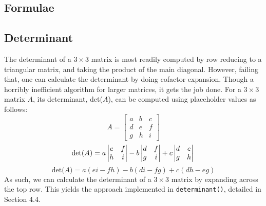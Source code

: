 \documentclass[12pt]{article}
\begin{document}
\newpage %



\begin{center}
\section{Formulae}
\end{center}
\subsection{Determinant}
The determinant of a $3\times3$ matrix is most readily computed by row reducing to a triangular matrix, and taking the product of the main diagonal. However, failing that, one can calculate the determinant by doing cofactor expansion. Though a horribly inefficient algorithm for larger matrices, it gets the job done. For a $3\times3$ matrix $A$, its determinant, det($A$), can be computed using placeholder values as follows:
\[
A =
\begin{bmatrix}
    a & b & c \\
    d & e & f \\
    g & h & i
\end{bmatrix}
\]
\begin{equation*}
\text{det($A$)} =
  a\begin{vmatrix}
  e & f\\
  h & i
  \end{vmatrix}  
  -b\begin{vmatrix}
  d & f\\
  g & i
  \end{vmatrix}  
  +c\begin{vmatrix}
  d & e\\
  g & h
  \end{vmatrix}\\\\
\end{equation*}
\begin{equation}
\text{det($A$)} =
a(ei-fh)-b(di-fg)+c(dh-eg)
\end{equation}
As such, we can calculate the determinant of a $3\times3$ matrix by expanding across the top row. This yields the approach implemented in \texttt{determinant()}, detailed in Section 4.4.
\end{document}
